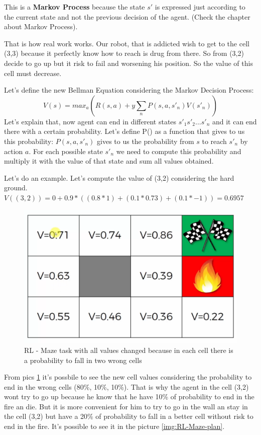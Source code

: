 This is a \textbf{Markov Process} because the state $s'$ is expressed just according to the current state and not the previous decision of the agent. (Check the chapter about Markov Process).

That is how real work works. Our robot, that is addicted wish to get to the cell (3,3) because it perfectly know how to reach is drug from there. So from (3,2) decide to go up but it risk to fail and worsening his position. So the value of this cell must decrease.

Let's define the new Bellman Equation considering the Markov Decision Process:
\begin{equation}
V(s) = max_a(R(s,a) + y \sum_{n} P(s,a,s'_n)V(s'_n))
\end{equation}
Let's explain that, now agent can end in different states $s'_1 s'_2 ... s'_n$ and it can end there with a certain probability. Let's define P() as a function that gives to us this probability:
$P(s,a,s'_n)$ gives to us the probability from $s$ to reach $s'_n$ by action $a$. For each possible state $s'_n$ we need to compute this probability and multiply it with the value of that state and sum all values obtained.

Let's do an example. Let's compute the value of (3,2) considering the hard ground.
$V((3,2)) = 0 + 0.9 * ((0.8 * 1) + (0.1 * 0.73) + (0.1 * -1)) = 0.6957$

\begin{figure}
    \centering
    \includegraphics[scale=0.35]{img/rl-maze-stoch.png}
    \caption{RL - Maze task with all values changed because in each cell there is a probability to fall in two wrong cells}
    \label{img:RL-Maze-stoch}
\end{figure}

From pics \ref{img:RL-Maze-stoch} it's possbile to see the new cell values considering the probability to end in the wrong cells (80\%, 10\%, 10\%). That is why the agent in the cell (3,2) wont try to go up because he know that he have 10\% of probability to end in the fire an die. But it is more convenient for him to try to go in the wall an stay in the cell (3,2) but have a 20\% of probability to fall in a better cell without risk to end in the fire. It's possible to see it in the picture \ref{img:RL-Maze-plan}.

